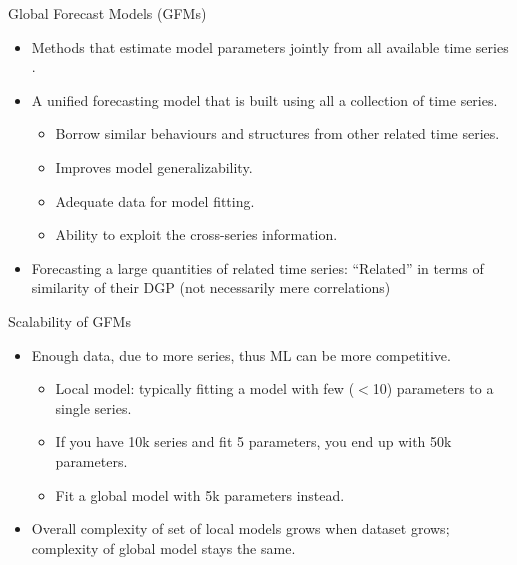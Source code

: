 \documentclass{beamer}
\begin{document}
   \begin{frame}{Global Forecast Models (GFMs)}
  	\begin{itemize}
  	\item Methods that estimate model parameters jointly from all available time series \cite{Januschowski2020-ud}.
	\vspace{2.0mm}
	\item A unified forecasting model that is built using all a collection of time series.
	\vspace{1.0mm}
	  \begin{itemize}\color{blue}
		\item Borrow similar behaviours and structures from other related time series.
		\item Improves model generalizability.
		\item Adequate data for model fitting.
		\item Ability to exploit the cross-series information.
	  \end{itemize}	   
	\vspace{2.0mm}	  
	  \item Forecasting a large quantities of related time series: ``Related'' in terms of similarity of their DGP (not
necessarily mere correlations)
 	\end{itemize}
   \end{frame} 
   
  
   \begin{frame}{Scalability of GFMs}
  	\begin{itemize}
  	\item Enough data, due to more series, thus ML can be more competitive.
	\vspace{2.0mm}
	  \begin{itemize}\color{blue}
		\item Local model: typically fitting a model with few ($<$10) parameters to a single series.
		\item If you have 10k series and fit 5 parameters, you end up with 50k parameters.
		\item Fit a global model with 5k parameters instead.
	  \end{itemize}	   
	\vspace{2.0mm}	  
	  \item Overall complexity of set of local models grows when dataset grows; complexity of global model stays the same.
 	\end{itemize}
   \end{frame}   
   
\end{document}
